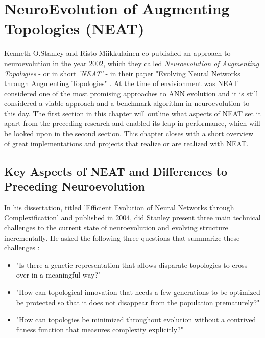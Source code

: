 \documentclass[journal, a4paper]{IEEEtran}
\begin{document}

\section{NeuroEvolution of Augmenting Topologies (NEAT)} \label{sec:neat}

Kenneth O.Stanley and Risto Miikkulainen co-published an approach to neuroevolution in the year 2002, which they called \textit{Neuroevolution of Augmenting Topologies} - or in short \textit{'NEAT'} - in their paper "Evolving Neural Networks through Augmenting Topologies" \cite{sta02_1}. At the time of envisionment was NEAT considered one of the most promising approaches to ANN evolution and it is still considered a viable approach and a benchmark algorithm in neuroevolution to this day. The first section in this chapter will outline what aspects of NEAT set it apart from the preceding research and enabled its leap in performance, which will be looked upon in the second section. This chapter closes with a short overview of great implementations and projects that realize or are realized with NEAT.



\subsection{Key Aspects of NEAT and Differences to Preceding Neuroevolution}

In his dissertation, titled 'Efficient Evolution of Neural Networks through Complexification' \cite{sta04} and published in 2004, did Stanley present three main technical challenges to the current state of neuroevolution and evolving structure incrementally. He asked the following three questions that summarize these challenges \cite[page 4]{sta04}:

\begin{itemize}
    \item "Is there a genetic representation that allows disparate topologies to cross over in a meaningful way?"
    \item "How can topological innovation that needs a few generations to be optimized be protected so that it does not disappear from the population prematurely?"
    \item "How can topologies be minimized throughout evolution without a contrived fitness function that measures complexity explicitly?"
\end{itemize}
\end{document}
